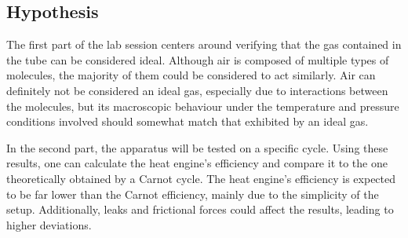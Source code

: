 \subsection{Hypothesis}
\label{Hypothesis}

The first part of the lab session centers around verifying that the gas contained in the tube can be considered ideal. Although air is composed of multiple types of molecules, the majority of them could be considered to act similarly. Air can definitely not be considered an ideal gas, especially due to interactions between the molecules, but its macroscopic behaviour under the temperature and pressure conditions involved should somewhat match that exhibited by an ideal gas.

In the second part, the apparatus will be tested on a specific cycle. Using these results, one can calculate the heat engine's efficiency and compare it to the one theoretically obtained by a Carnot cycle. The heat engine's efficiency is expected to be far lower than the Carnot efficiency, mainly due to the simplicity of the setup. Additionally, leaks and frictional forces could affect the results, leading to higher deviations.
